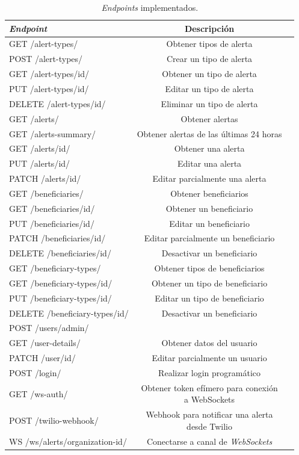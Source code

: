 \begin{table}[H]
	\centering
	\caption[\textit{Endpoints} implementados.]{\textit{Endpoints} implementados.}
	\begin{tabular}{l c c}    
		\toprule
		\textbf{\textit{Endpoint}} 	 & \textbf{Descripción} \\
		\midrule
		GET /alert-types/ & Obtener tipos de alerta  \\		
		POST /alert-types/& Crear un tipo de alerta		\\		
		GET /alert-types/{id}/ & Obtener un tipo de alerta \\
		PUT /alert-types/{id}/ & Editar un tipo de alerta		\\
		DELETE /alert-types/{id}/ & Eliminar un tipo de alerta  \\
		GET /alerts/ & Obtener alertas  \\		
		GET /alerts-summary/ & Obtener alertas de las últimas 24 horas \\		
		GET /alerts/{id}/ & Obtener una alerta \\
		PUT /alerts/{id}/ & Editar una alerta		\\
		PATCH /alerts/{id}/ & Editar parcialmente una alerta   \\
		GET /beneficiaries/ & Obtener beneficiarios  \\			
		GET /beneficiaries/{id}/ & Obtener un beneficiario \\
		PUT /beneficiaries/{id}/ & Editar un beneficiario		\\
		PATCH /beneficiaries/{id}/ & Editar parcialmente un beneficiario   \\
		DELETE /beneficiaries/{id}/ & Desactivar un beneficiario \\
		GET /beneficiary-types/ & Obtener tipos de beneficiarios  \\			
		GET /beneficiary-types/{id}/ & Obtener un tipo de beneficiario \\
		PUT /beneficiary-types/{id}/ & Editar un tipo de beneficiario		\\
		DELETE /beneficiary-types/{id}/ & Desactivar un beneficiario \\
		POST /users/admin/ & \makecell{Crear un usuario administrador}  \\			
		GET /user-details/ & Obtener datos del usuario \\
		PATCH /user/{id}/ & Editar parcialmente un usuario \\
		POST /login/ & Realizar login programático \\	
		GET /ws-auth/ & \makecell{Obtener token efímero para  conexión \\ a WebSockets} \\
		POST /twilio-webhook/ & \makecell{Webhook para notificar una  alerta \\ desde Twilio} \\	
		WS /ws/alerts/organization-{id}/ & Conectarse a canal de \textit{WebSockets}	\\
		\bottomrule
		\hline
	\end{tabular}
	\label{tab:endpoints}
\end{table}

